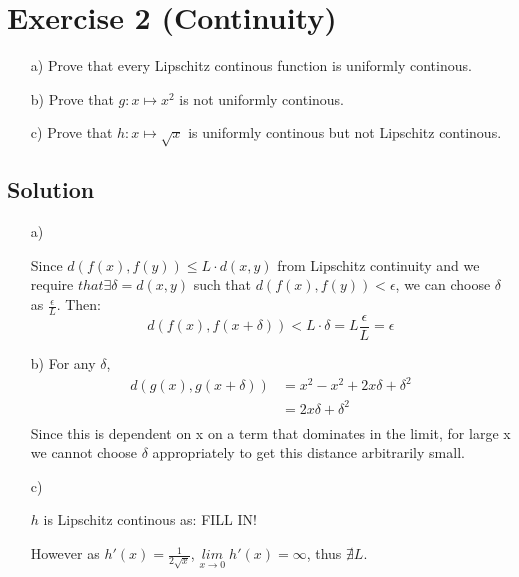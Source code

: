 \documentclass[10pt]{article}
\numberwithin{equation}{section}
\begin{document}
\section*{Exercise 2 (Continuity)}
\begin{enumerate}
\item[a)]{
    Prove that every Lipschitz continous function is uniformly continous.
  }
\item[b)]{
    Prove that $g: x \mapsto x^2$ is not uniformly continous.
  }
\item[c)]{
    Prove that $h: x \mapsto \sqrt{x}$ is uniformly continous but not Lipschitz continous.
  }
\end{enumerate}
\subsection*{Solution}
\begin{enumerate}
\item[a)]{
    Since $d(f(x),f(y)) \leq L \cdot d(x,y)$ from Lipschitz continuity and we require $that  \exists \delta = d(x,y)$ such that $d(f(x),f(y)) < \epsilon$, we can choose $\delta$ as $\frac{\epsilon}{L}$. Then:
    $$d(f(x), f(x+\delta)) < L \cdot \delta = L \frac{\epsilon}{L} = \epsilon$$

  }
\item[b)]{
    For any $\delta$,
    \begin{align*}
      d(g(x), g(x + \delta)) &= x^2 - x^2 + 2x\delta + \delta^2\\
                           &= 2x\delta + \delta^2\\
    \end{align*}
    Since this is dependent on x on a term that dominates in the limit, for large x we cannot choose $\delta$ appropriately to get this distance arbitrarily small.
  }
\item[c)]{
    $h$ is Lipschitz continous as:
    FILL IN!

      However as $h'(x) = \frac{1}{2\sqrt{x}}$, $\underset{x\rightarrow 0}{lim} \; h'(x) = \infty$, thus $\nexists L$.
  }

\end{enumerate}
\end{document}
